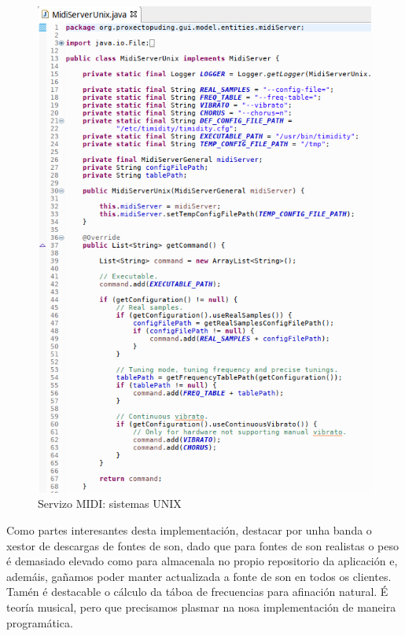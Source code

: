    \begin{figure}[htbp]
    \centering
    \includegraphics[scale=0.6, keepaspectratio=true]{./imagenes/timidity.png}
    \caption{Servizo MIDI: sistemas UNIX}
    \label{figura:Timidity}
   \end{figure}
   
   Como partes interesantes desta implementación, destacar por unha banda o
   xestor de descargas de fontes de son, dado que para fontes de son realistas
   o peso é demasiado elevado como para almacenala no propio repositorio da
   aplicación e, ademáis, gañamos poder manter actualizada a fonte de son en
   todos os clientes. \\
   
   Tamén é destacable o cálculo da táboa de frecuencias para afinación natural.
   É teoría musical, pero que precisamos plasmar na nosa implementación de
   maneira programática. \\
   
